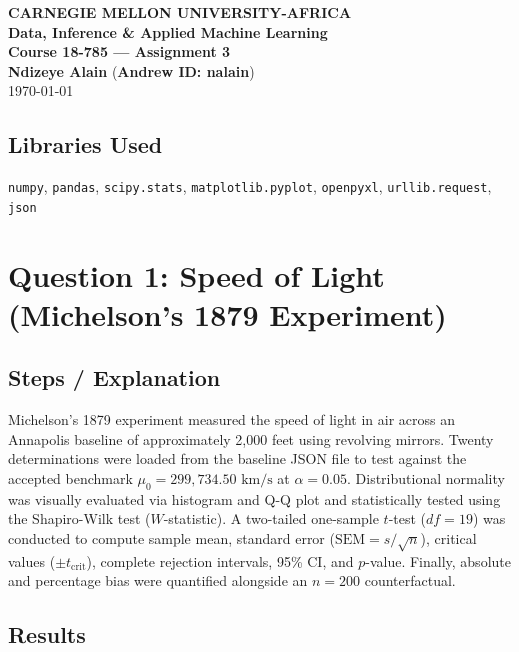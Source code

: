 \documentclass[11pt,a4paper]{article}
\begin{document}
\begin{center}
    {\Large \textbf{CARNEGIE MELLON UNIVERSITY-AFRICA}}\\[4pt]
    {\large \textbf{Data, Inference \& Applied Machine Learning}}\\[2pt]
    {\textbf{Course 18-785 --- Assignment 3}}\\[8pt]
    \textbf{Ndizeye Alain} \quad (\textbf{Andrew ID: nalain})\\[4pt]
    \today
\end{center}

\newpage

\subsection*{Libraries Used}
\texttt{numpy}, \texttt{pandas}, \texttt{scipy.stats}, \texttt{matplotlib.pyplot}, \texttt{openpyxl}, \texttt{urllib.request}, \texttt{json}

\newpage

\section*{Question 1: Speed of Light (Michelson's 1879 Experiment)}

\subsection*{Steps / Explanation}
Michelson's 1879 experiment measured the speed of light in air across an Annapolis baseline of approximately 2,000 feet using revolving mirrors. Twenty determinations were loaded from the baseline JSON file to test against the accepted benchmark $\mu_0 = 299,734.50\text{ km/s}$ at $\alpha = 0.05$. Distributional normality was visually evaluated via histogram and Q-Q plot and statistically tested using the Shapiro-Wilk test ($W$-statistic). A two-tailed one-sample $t$-test ($df = 19$) was conducted to compute sample mean, standard error ($\text{SEM} = s / \sqrt{n}$), critical values ($\pm t_{\text{crit}}$), complete rejection intervals, 95\% CI, and $p$-value. Finally, absolute and percentage bias were quantified alongside an $n = 200$ counterfactual.

\subsection*{Results}
\end{document}

